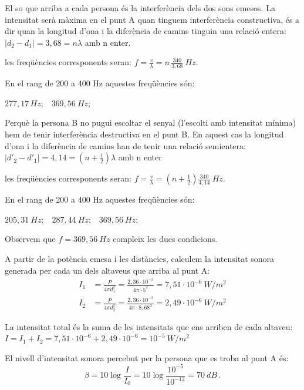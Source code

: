 \begin{solapartat}
 El so que arriba a cada persona és la interferència dels dos sons emesos. La intensitat serà màxima en el punt A quan tinguem interferència constructiva, és a dir quan la longitud d'ona i la diferència de camins tinguin una relació entera: $|d_2 - d_1| = 3,68 = n\lambda$ amb n enter.

 les freqüències corresponents seran: $f = \frac{v}{\lambda} = n\,\frac{340}{3,68}\ Hz$.

 En el rang de 200 a 400 Hz aquestes freqüències són:

$277,17\,Hz$;\ \ $369,56\ Hz$;

 Perquè la persona B no pugui escoltar el senyal (l'escolti amb intensitat mínima) hem de tenir interferència destructiva en el punt B. En aquest cas la longitud d'ona i la diferència de camins han de tenir una relació semientera: $|d'_2 - d'_1| = 4,14 = \left(n + \frac{1}{2}\right)\lambda$ amb n enter

 les freqüències corresponents seran: $f = \frac{v}{\lambda} = \left(n + \frac{1}{2}\right)\frac{340}{4,14}\ Hz$.

 En el rang de 200 a 400 Hz aquestes freqüències són:

$205,31\ Hz$;\ \ $287,44\ Hz$;\ \ $369,56\ Hz$;

Observem que $f = 369,56\ Hz$ compleix les dues condicions.
\end{solapartat}

\begin{solapartat}
 A partir de la potència emesa i les distàncies, calculem la intensitat sonora generada per cada un dels altaveus que arriba al punt A:
\begin{align*}
I_1 &= \frac{P}{4\pi d_1^2} = \frac{2,36\cdot 10^{-3}}{4\pi\cdot 5^2} = 7,51\cdot 10^{-6}\ W/m^2\\
I_2 &= \frac{P}{4\pi d_2^2} = \frac{2,36\cdot 10^{-3}}{4\pi\cdot 8,68^2} = 2,49\cdot 10^{-6}\ W/m^2
\end{align*}

 La intensitat total és la suma de les intensitats que ens arriben de cada altaveu: $I = I_1 + I_2 = 7,51\cdot 10^{-6} + 2,49\cdot 10^{-6} = 10^{-5}\ W/m^2$

 El nivell d'intensitat sonora percebut per la persona que es troba al punt A és:
\[ \beta = 10\log\frac{I}{I_0} = 10\log\frac{10^{-5}}{10^{-12}} = 70\ dB\,. \]
\end{solapartat}

